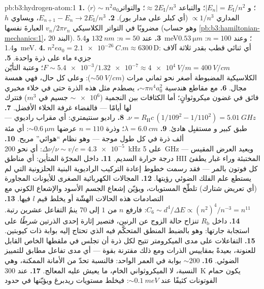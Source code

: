 \begin{solution}{pb:b3:hydrogen-atom:1}
\textbf{1.} $\langle r\rangle \sim n^2a_0$؛ و $|E_n| =
E_{\text{I}}/n^2$؛ والتباعد $\approx 2E_{\text{I}}/n^3$؛ والتواتر
المداري $\propto 1/n^3$ (أي كبلر على مدار بور).
\textbf{2.} $E_{n+1} - E_n \to 2E_{\text{I}}/n^3$، ويساوي $h$ مضروبًا
في التواتر الكلاسيكي $v_n/2\pi r_n$ العبارةَ نفسها
(وهو حساب \cref{pb:b3:hamiltonian-mechanics:1}، البند 20).
\textbf{3.} عند $n = 50$: $\qty{132}{nm}$ و\qty{5.4}{meV}؛ وعند $n = 100$:
$\qty{0.53}{\micro m}$ و\qty{1.4}{meV}.
\textbf{4.} $n^2ea_0 = \qty{2.1e-26}{C.m} \approx 6300\,\text{D}$:
أي ثنائي قطب بقدر ثلاثة آلاف جزيء ماء على ذرة واحدة.
\textbf{5.} $F \sim \num{5.4e-3}/\num{1.32e-7} \approx
\qty{4e4}{V/m} = \qty{400}{V/cm}$؛ وعتبة التأيّن الكلاسيكية
المضبوطة أصغر نحو ثماني مرات ($\sim\qty{50}{V/cm}$):
وعلى كل حال، فهي همسة مجال.
\textbf{6.} مع مقاطع هندسية $\sim\pi n^4a_0^2$، يصطدم مثل هذه
الذرة حتى في خلاء مخبري فائق في غضون
ميكروثوانٍ؛ أما الكثافات بين النجمية ($\sim\num{e6}$ جسيم في
$\unit{m^3}$) فتترك لها أيامًا --- فالفضاء غرفة الخلاء الأفضل.
\textbf{7.} $\nu = R_{\text{H}}c\,(1/109^2 - 1/110^2) =
\qty{5.01}{GHz}$.
\textbf{8.} راديو سنتيمتري: أي مقراب راديوي --- طبق كبير و
مستقبِل هادئ.
\textbf{9.} $\lambda = \qty{6.0}{cm}$؛ وذرة $n = 110$ عرضها
$\sim\qty{0.6}{\micro m}$: أي مئة ألف ذرة في كل
طول موجة --- وهو نظام ``هوائي'' مريح.
\textbf{10.} $\Delta\nu/\nu \sim v/c = \num{4.3e-5}$: أي نحو
\qty{200}{kHz} على \qty{5}{GHz} --- ويعيد العرض المقيس
درجة حرارة السديم.
\textbf{11.} داخل المجرّة المتأين: أي مناطق HII المختبئة وراء
غبار يطفئ كل فوتون بالمر --- فقد رسمت خطوط إعادة التركيب
الراديوية البنية الحلزونية التي لم يستطع علم الفلك الضوئي رؤيتها.
\textbf{12.} المجالات الكهربائية الصغرى للأيونات المجاورة (أي تعريض
شتارك) تلطّخ المستويات، ويؤيّن إشعاع الجسم الأسود والإشعاع الكوني
مع التصادمات هذه الحالات الهشّة أو يخلط قيم $l$ فيها.
\textbf{13.} $C_6 \sim d^4/\Delta E \propto (n^2)^4/n^{-3} =
n^{11}$: فارفع $n$ من $1$ إلى $70$ ينمُ التفاعل
عشرين رتبة.
\textbf{14.} داخل $R_{\text{b}}$ تنزاح حالة الزوج عن
الرنين، فتصير إثارة إحدى الذرتين \emph{شرطًا} على استجابة
جارتها: وهو بالضبط المنطق المتحكَّم فيه الذي تحتاج إليه بوابة
ذات كيوبتين.
\textbf{15.} التفاعلات على مدى الميكرومتر تتيح لكل ذرة أن تجلس في
ملقطها الخاص القابل للعنونة، بعيدةً بمقاييس الذرات ومع ذلك
مقترنة بقوة --- أي مدى تفاعل مطابق للتمييز
الضوئي.
\textbf{16.} $\sim 200$ بوابة في العمر الواحد: فالنسبة تحدّ من
الأمانة الممكنة، وهي النسبة، لا الميكروثواني الخام،
ما يعيش عليه المعالج.
\textbf{17.} عند \qty{300}{K} يكون حمام الفوتونات كثيفًا عند
$\sim\qty{0.1}{meV}$: فيخلط مستويات ريدبرغ ويؤيّنها في حدود

\end{solution}
